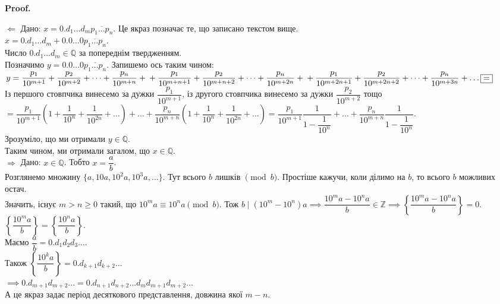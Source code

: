 \documentclass[a4paper, 10pt]{article}
\makeatletter
\theoremstyle{theoremdd}
\theoremstyle{theoremdd}
\theoremstyle{theoremdd}
\theoremstyle{theoremdd}
\theoremstyle{theoremdd}
\theoremstyle{theoremdd}
\theoremstyle{theoremdd}
\theoremstyle{theoremdd}
\def\rightproof{$\boxed{\Rightarrow}$ }
\def\leftproof{$\boxed{\Leftarrow}$ }
\renewenvironment{proof}[1][Proof.\\]{\par
\pushQED{\hfill \qed}%
\normalfont \topsep6\p@\@plus6\p@\relax
\trivlist
\item\relax
{\bfseries
#1\@addpunct{.}}\hspace\labelsep\ignorespaces
}{%
\popQED\endtrivlist\@endpefalse
}
\makeatother
\begin{document}
\begin{proof}
\leftproof Дано: $x = 0.d_1\dots d_m \overline{p_1 \dots p_n}$. Це якраз позначає те, що записано текстом вище.\\
$x = 0.d_1\dots d_m + 0.0\dots 0 \overline{p_1\dots p_n}$.\\
Число $0.d_1\dots d_m \in \mathbb{Q}$ за попереднім твердженням.\\
Позначимо $y = 0.0\dots 0 \overline{p_1 \dots p_n}$. Запишемо ось таким чином:\\
$y = \dfrac{p_1}{10^{m+1}} + \dfrac{p_2}{10^{m+2}} + \dots + \dfrac{p_n}{10^{m+n}} + \\
+ \dfrac{p_1}{10^{m+n+1}} + \dfrac{p_2}{10^{m+n+2}} + \dots + \dfrac{p_n}{10^{m+2n}} + \\
+ \dfrac{p_1}{10^{m+2n+1}} + \dfrac{p_2}{10^{m+2n+2}} + \dots + \dfrac{p_n}{10^{m+3n}} + \dots \boxed{=}$\\
Із першого стовпчика винесемо за дужки $\dfrac{p_1}{10^{m+1}}$, із другого стовпчика винесемо за дужки $\dfrac{p_2}{10^{m+2}}$ тощо\\
$\boxed{=} \dfrac{p_1}{10^{m+1}} \left( 1 + \dfrac{1}{10^n} + \dfrac{1}{10^{2n}} + \dots \right) + \dots + \dfrac{p_n}{10^{m+n}} \left( 1 + \dfrac{1}{10^n} + \dfrac{1}{10^{2n}} + \dots \right) = \dfrac{p_1}{10^{m+1}} \dfrac{1}{1-\dfrac{1}{10^n}} + \dots + \dfrac{p_n}{10^{m+n}} \dfrac{1}{1-\dfrac{1}{10^n}}$.\\
Зрозуміло, що ми отримали $y \in \mathbb{Q}$.\\
Таким чином, ми отримали загалом, що $x \in \mathbb{Q}$.
\bigskip \\
\rightproof Дано: $x \in \mathbb{Q}$. Тобто $x = \dfrac{a}{b}$.\\
Розглянемо множину $\{a,10a,10^2a,10^3a,\dots\}$. Тут всього $b$ лишків $\pmod b$. Простіше кажучи, коли ділимо на $b$, то всього $b$ можливих остач.\\
Значить, існує $m > n \geq 0$ такий, що $10^m a \equiv 10^n a \pmod b$. Тож $b \mid (10^m-10^n)a \implies \dfrac{10^ma-10^na}{b} \in \mathbb{Z} \implies \left\{ \dfrac{10^m a - 10^n a}{b} \right\} = 0$.\\
$\left\{ \dfrac{10^m a}{b} \right\} = \left\{ \dfrac{10^n a}{b} \right\}$.\\
Маємо $\dfrac{a}{b} = 0.d_1d_2d_3\dots$.\\
Також $\left\{ \dfrac{10^k a}{b} \right\} = 0.d_{k+1}d_{k+2}\dots$\\
$\implies 0.d_{m+1}d_{m+2} \dots = 0.d_{n+1}d_{n+2} \dots d_{m} d_{m+1} d_{m+2} \dots$\\
А це якраз задає період десяткового представлення, довжина якої $m-n$.
\end{proof}
\fi
\newpage
\end{document}
